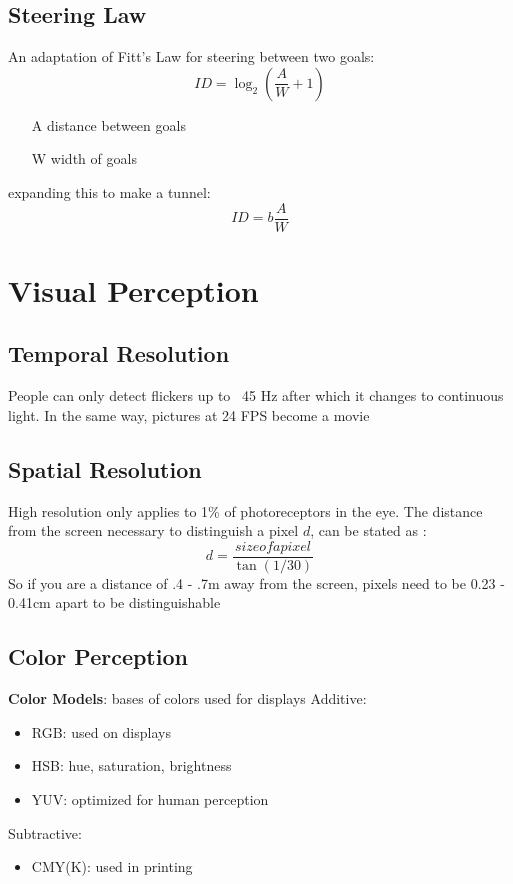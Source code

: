 \documentclass[]{article}
\theoremstyle{definition}
\begin{document}
	\subsection{Steering Law}
	An adaptation of Fitt's Law for steering between two goals:
	\begin{equation*}
		ID = \log_2 (\frac{A}{W} + 1)
	\end{equation*}
	\begin{itemize}
		\item[A] distance between goals
		\item[W] width of goals
	\end{itemize}
	expanding this to make a tunnel:
	\begin{equation*}
		ID = b \frac{A}{W}	
	\end{equation*}

	\section{Visual Perception}
	\subsection{Temporal Resolution}
	People can only detect flickers up to ~45 Hz after which it changes to continuous light. 
	In the same way, pictures at 24 FPS become a movie

	\subsection{Spatial Resolution}
	High resolution only applies to 1\% of photoreceptors in the eye.
	The distance from the screen necessary to distinguish a pixel $d$, can be stated as :
	\begin{equation*}
		d = \frac{size of a pixel}{\tan (1/30)}
	\end{equation*}
	So if you are a distance of .4 - .7m away from the screen, pixels need to be 0.23 - 0.41cm apart to be distinguishable

	\subsection{Color Perception}
	\textbf{Color Models}: bases of colors used for displays
	Additive:
	\begin{itemize}
		\item RGB: used on displays
		\item HSB: hue, saturation, brightness
		\item YUV: optimized for human perception
	\end{itemize}
	Subtractive:
	\begin{itemize}
		\item CMY(K): used in printing
	\end{itemize}
\end{document}
